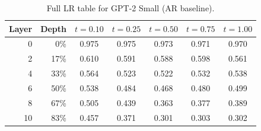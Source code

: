 \documentclass[11pt]{article}
\begin{document}
\begin{table}[h]
\centering
\caption{Full LR table for GPT-2 Small (AR baseline).}
\label{tab:full_lr_ar}
\begin{tabular}{rr ccccc}
\toprule
\textbf{Layer} & \textbf{Depth} & $t=0.10$ & $t=0.25$ & $t=0.50$ & $t=0.75$ & $t=1.00$ \\
\midrule
0  & 0\%   & 0.975 & 0.975 & 0.973 & 0.971 & 0.970 \\
2  & 17\%  & 0.610 & 0.591 & 0.588 & 0.598 & 0.561 \\
4  & 33\%  & 0.564 & 0.523 & 0.522 & 0.532 & 0.538 \\
6  & 50\%  & 0.538 & 0.484 & 0.468 & 0.480 & 0.499 \\
8  & 67\%  & 0.505 & 0.439 & 0.363 & 0.377 & 0.389 \\
10 & 83\%  & 0.457 & 0.371 & 0.301 & 0.303 & 0.302 \\
\bottomrule
\end{tabular}
\end{table}
\end{document}
